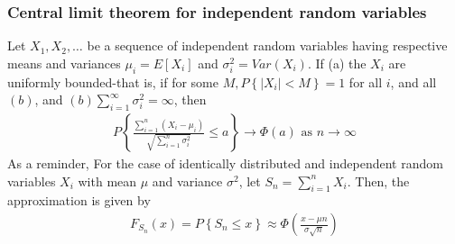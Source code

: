 \documentclass[a4paper]{article}
\begin{document}
\subsubsection{Central limit theorem for independent random variables}
Let $X_1,X_2,\dots$ be a sequence of independent random variables having respective means and variances $\mu_i=E[X_i]$ and $\sigma_i^2=Var(X_i)$. If (a) the $X_i$ are uniformly bounded-that is, if for some $M,P\left\{ |X_i|<M \right\}=1$ for all $i$, and all $(b)$, and $(b) \sum_{i=1}^{\infty}\sigma_i^2=\infty$, then
\begin{align}
  P\left\{ \frac{\sum_{i=1}^{n}(X_i-\mu_i)}{\sqrt{\sum_{i=1}^{n}\sigma^2_i}}\leq a \right\}\rightarrow\Phi(a) \text{ as }n\rightarrow\infty
\end{align}
As a reminder, For the case of identically distributed and independent random variables $X_i$ with mean $\mu$ and variance $\sigma^2$, let $S_n=\sum_{i=1}^{n}X_i$. Then, the approximation is given by
\begin{align}
  F_{S_n}(x)=P\left\{ S_n\leq x \right\}\approx \Phi(\frac{x-\mu n}{\sigma\sqrt{n}})
\end{align}
\end{document}
